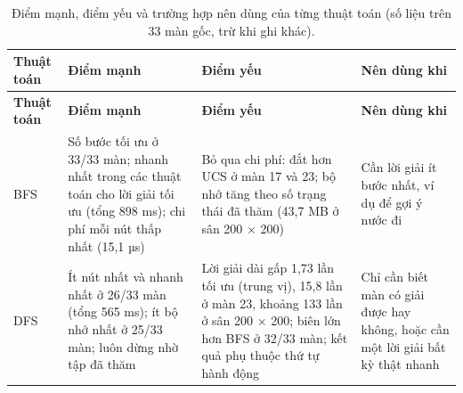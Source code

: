 \begin{longtable}[]{@{}
  >{\raggedright\arraybackslash}p{}
  >{\raggedright\arraybackslash}p{}
  >{\raggedright\arraybackslash}p{}
  >{\raggedright\arraybackslash}p{}@{}}
\caption{ Điểm mạnh, điểm yếu và trường hợp nên dùng của từng thuật toán (số liệu trên 33 màn gốc, trừ khi ghi khác).}\tabularnewline
\toprule\noalign{}
\rowcolor{tablehead}\begin{minipage}[b]{\linewidth}\raggedright
\textbf{Thuật toán}
\end{minipage} & \begin{minipage}[b]{\linewidth}\raggedright
\textbf{Điểm mạnh}
\end{minipage} & \begin{minipage}[b]{\linewidth}\raggedright
\textbf{Điểm yếu}
\end{minipage} & \begin{minipage}[b]{\linewidth}\raggedright
\textbf{Nên dùng khi}
\end{minipage} \\
\midrule\noalign{}
\endfirsthead
\toprule\noalign{}
\rowcolor{tablehead}\begin{minipage}[b]{\linewidth}\raggedright
\textbf{Thuật toán}
\end{minipage} & \begin{minipage}[b]{\linewidth}\raggedright
\textbf{Điểm mạnh}
\end{minipage} & \begin{minipage}[b]{\linewidth}\raggedright
\textbf{Điểm yếu}
\end{minipage} & \begin{minipage}[b]{\linewidth}\raggedright
\textbf{Nên dùng khi}
\end{minipage} \\
\midrule\noalign{}
\endhead
\bottomrule\noalign{}
\endlastfoot
BFS & Số bước tối ưu ở 33/33 màn; nhanh nhất trong các thuật toán cho lời giải tối ưu (tổng 898 ms); chi phí mỗi nút thấp nhất (15,1 µs) & Bỏ qua chi phí: đắt hơn UCS ở màn 17 và 23; bộ nhớ tăng theo số trạng thái đã thăm (43,7 MB ở sân 200 × 200) & Cần lời giải ít bước nhất, ví dụ để gợi ý nước đi \\
\rowrule
DFS & Ít nút nhất và nhanh nhất ở 26/33 màn (tổng 565 ms); ít bộ nhớ nhất ở 25/33 màn; luôn dừng nhờ tập đã thăm & Lời giải dài gấp 1,73 lần tối ưu (trung vị), 15,8 lần ở màn 23, khoảng 133 lần ở sân 200 × 200; biên lớn hơn BFS ở 32/33 màn; kết quả phụ thuộc thứ tự hành động & Chỉ cần biết màn có giải được hay không, hoặc cần một lời giải bất kỳ thật nhanh \\

\end{longtable}
